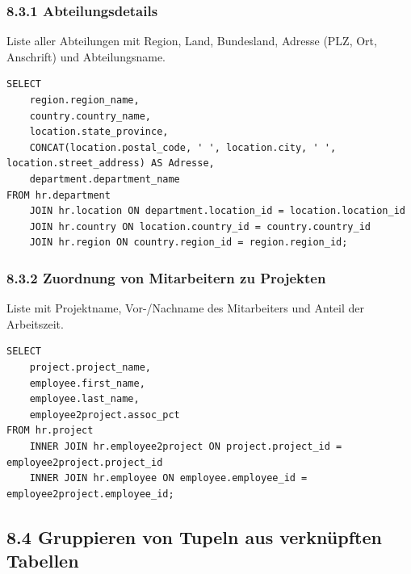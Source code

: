 \documentclass[11pt,a4paper]{article}
\begin{document}
\subsubsection*{8.3.1 \quad Abteilungsdetails}
Liste aller Abteilungen mit Region, Land, Bundesland, Adresse (PLZ, Ort, Anschrift) und Abteilungsname.
\begin{loesung}
\begin{lstlisting}
SELECT
    region.region_name,
    country.country_name,
    location.state_province,
    CONCAT(location.postal_code, ' ', location.city, ' ', location.street_address) AS Adresse,
    department.department_name
FROM hr.department
    JOIN hr.location ON department.location_id = location.location_id
    JOIN hr.country ON location.country_id = country.country_id
    JOIN hr.region ON country.region_id = region.region_id;
\end{lstlisting}
\end{loesung}

\subsubsection*{8.3.2 \quad Zuordnung von Mitarbeitern zu Projekten}
Liste mit Projektname, Vor-/Nachname des Mitarbeiters und Anteil der Arbeitszeit.
\begin{loesung}
\begin{lstlisting}
SELECT
    project.project_name,
    employee.first_name,
    employee.last_name,
    employee2project.assoc_pct
FROM hr.project
    INNER JOIN hr.employee2project ON project.project_id = employee2project.project_id
    INNER JOIN hr.employee ON employee.employee_id = employee2project.employee_id;
\end{lstlisting}
\end{loesung}

\subsection*{8.4 \quad Gruppieren von Tupeln aus verkn\"upften Tabellen}
\end{document}

